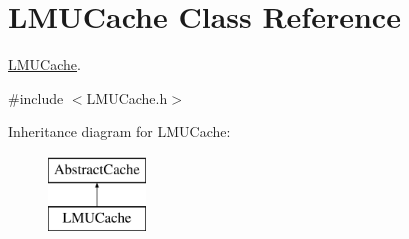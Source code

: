 \hypertarget{classLMUCache}{\section{\-L\-M\-U\-Cache \-Class \-Reference}
\label{classLMUCache}
}


\hyperlink{classLMUCache}{\-L\-M\-U\-Cache}.  




{\ttfamily \#include $<$\-L\-M\-U\-Cache.\-h$>$}

\-Inheritance diagram for \-L\-M\-U\-Cache\-:\begin{figure}[H]
\begin{center}
\leavevmode
\includegraphics[height=2.000000cm]{classLMUCache}
\end{center}
\end{figure}

